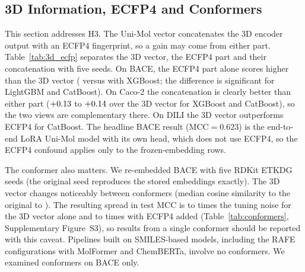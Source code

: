 \documentclass[pdflatex,sn-basic]{sn-jnl}%
\begin{document}
\begin{table}[!ht]
\centering
\caption{Coverage of the dataset molecules by ZINC-250k (maximum Morgan-Tanimoto similarity).}
\label{tab:coverage}
\small

\end{table}

\FloatBarrier
\subsection{3D Information, ECFP4 and Conformers}\label{sec:3d_ecfp}
This section addresses H3. The Uni-Mol vector concatenates the 3D encoder output with an ECFP4 fingerprint, so a gain may come from either part. Table~\ref{tab:3d_ecfp} separates the 3D vector, the ECFP4 part and their concatenation with five seeds. On BACE, the ECFP4 part alone scores higher than the 3D vector (\ecfpbace{} versus \threedbace{} with XGBoost; the difference is significant for LightGBM and CatBoost). On Caco-2 the concatenation is clearly better than either part ($+0.13$ to $+0.14$ over the 3D vector for XGBoost and CatBoost), so the two views are complementary there. On DILI the 3D vector outperforms ECFP4 for CatBoost. The headline BACE result (MCC$=0.623$) is the end-to-end LoRA Uni-Mol model with its own head, which does not use ECFP4, so the ECFP4 confound applies only to the frozen-embedding rows.

The conformer also matters. We re-embedded BACE with five RDKit ETKDG seeds (the original seed reproduces the stored embeddings exactly). The 3D vector changes noticeably between conformers (median cosine similarity to the original \coslo{} to \coshi{}). The resulting spread in test MCC is \rthreedlo{} to \rthreedhi{} times the tuning noise for the 3D vector alone and \rcatlo{} to \rcathi{} times with ECFP4 added (Table~\ref{tab:conformers}, Supplementary Figure~S3), so results from a single conformer should be reported with this caveat. Pipelines built on SMILES-based models, including the RAFE configurations with MolFormer and ChemBERTa, involve no conformers. We examined conformers on BACE only.

\begin{table}[!ht]
\centering
\caption{3D versus ECFP4 within the Uni-Mol vector (XGBoost, five seeds; MCC, and Spearman for Caco-2).}
\label{tab:3d_ecfp}
\scriptsize

\end{table}

\begin{table}[!ht]
\centering
\caption{Conformer-seed sensitivity on BACE (five conformer seeds times three tree seeds).}
\label{tab:conformers}
\scriptsize

\end{table}
\end{document}
